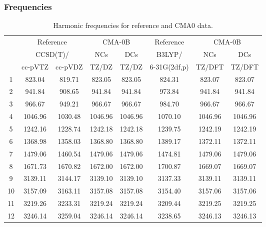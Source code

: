 \documentclass[10pt,oneside]{article}
\begin{document}
\subsubsection*{Frequencies}
\begin{table}[h!]
\centering
\caption{Harmonic frequencies for reference and CMA0 data.}
\begin{tabular}{cccccccc}
\toprule
{} & \multicolumn{2}{c}{Reference} & \multicolumn{2}{c}{CMA-0B} &    Reference & \multicolumn{2}{c}{CMA-0B} \\
{} & \multicolumn{2}{c}{CCSD(T)/} &     NCs &     DCs &       B3LYP/ &     NCs &     DCs \\
{} &   cc-pVTZ & cc-pVDZ &   TZ/DZ &   TZ/DZ & 6-31G(2df,p) &  TZ/DFT &  TZ/DFT \\
\midrule
1  &    823.04 &  819.71 &  823.05 &  823.05 &       824.31 &  823.07 &  823.07 \\
2  &    941.84 &  908.65 &  941.84 &  941.84 &       973.84 &  941.84 &  941.84 \\
3  &    966.67 &  949.21 &  966.67 &  966.67 &       984.70 &  966.67 &  966.67 \\
4  &   1046.96 & 1030.48 & 1046.96 & 1046.96 &      1070.10 & 1046.96 & 1046.96 \\
5  &   1242.16 & 1228.74 & 1242.18 & 1242.18 &      1239.75 & 1242.19 & 1242.19 \\
6  &   1368.98 & 1358.03 & 1368.80 & 1368.80 &      1389.17 & 1372.11 & 1372.11 \\
7  &   1479.06 & 1460.54 & 1479.06 & 1479.06 &      1474.81 & 1479.06 & 1479.06 \\
8  &   1671.73 & 1670.82 & 1672.00 & 1672.00 &      1700.87 & 1669.07 & 1669.07 \\
9  &   3139.11 & 3144.17 & 3139.10 & 3139.10 &      3137.33 & 3139.11 & 3139.11 \\
10 &   3157.09 & 3163.11 & 3157.08 & 3157.08 &      3154.40 & 3157.06 & 3157.06 \\
11 &   3219.26 & 3233.31 & 3219.24 & 3219.24 &      3209.44 & 3219.25 & 3219.25 \\
12 &   3246.14 & 3259.04 & 3246.14 & 3246.14 &      3238.65 & 3246.13 & 3246.13 \\
\bottomrule
\end{tabular}
\end{table}

\clearpage
\end{document}
